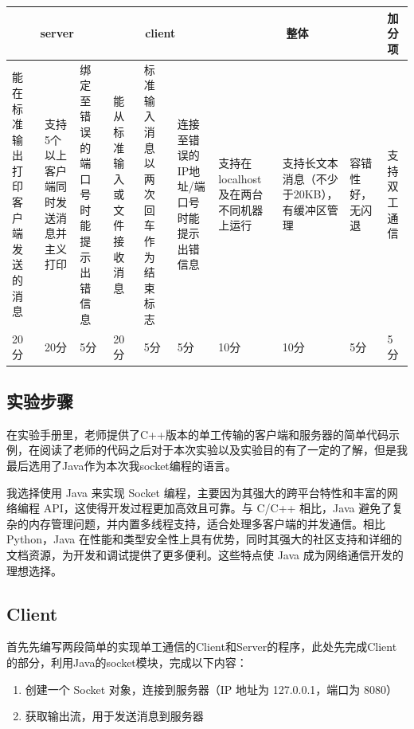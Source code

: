 \documentclass{article}
\begin{document}
	\begin{table}[!ht]
		\centering
		\begin{tabular}{|p{1.4cm}|p{1.4cm}|p{1.4cm}|p{1.4cm}|p{1.4cm}|p{1.4cm}|p{1.4cm}|p{1.4cm}|p{1.4cm}|p{1.4cm}|}
			\hline
			\multicolumn{3}{|c|}{server} & \multicolumn{3}{|c|}{client} & \multicolumn{3}{|c|}{整体} & 加分项 \\ \hline
			能在标准输出打印客户端发送的消息 & 支持5个以上客户端同时发送消息并主义打印 & 绑定至错误的端口号时能提示出错信息 & 能从标准输入或文件接收消息 & 标准输入消息以两次回车作为结束标志 & 连接至错误的IP地址/端口号时能提示出错信息 & 支持在localhost及在两台不同机器上运行 & 支持长文本消息（不少于20KB），有缓冲区管理 & 容错性好，无闪退 & 支持双工通信 \\ \hline
			20分 & 20分 & 5分 & 20分 & 5分 & 5分 & 10分 & 10分 & 5分 & 5分 \\ \hline
		\end{tabular}
	\end{table}
	
	\subsection{实验步骤}
	
	在实验手册里，老师提供了C++版本的单工传输的客户端和服务器的简单代码示例，在阅读了老师的代码之后对于本次实验以及实验目的有了一定的了解，但是我最后选用了Java作为本次我socket编程的语言。
	
	我选择使用 Java 来实现 Socket 编程，主要因为其强大的跨平台特性和丰富的网络编程 API，这使得开发过程更加高效且可靠。与 C/C++ 相比，Java 避免了复杂的内存管理问题，并内置多线程支持，适合处理多客户端的并发通信。相比 Python，Java 在性能和类型安全性上具有优势，同时其强大的社区支持和详细的文档资源，为开发和调试提供了更多便利。这些特点使 Java 成为网络通信开发的理想选择。
	
	\subsection{Client}
	
	首先先编写两段简单的实现单工通信的Client和Server的程序，此处先完成Client的部分，利用Java的socket模块，完成以下内容：
	
	\begin{enumerate}[noitemsep, label={{\arabic*})}]
		\item 创建一个 Socket 对象，连接到服务器（IP 地址为 127.0.0.1，端口为 8080）
		\item 获取输出流，用于发送消息到服务器
	\end{enumerate}\textbf{}
	
\end{document}
